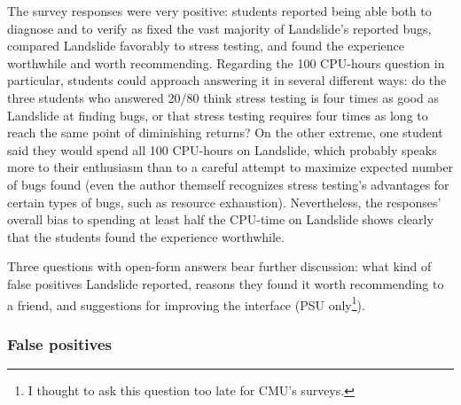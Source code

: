 The survey responses were very positive:
students reported being able both to diagnose and to verify as fixed the vast majority of Landslide's reported bugs,
compared Landslide favorably to stress testing,
and found the experience worthwhile and worth recommending.
Regarding the 100 CPU-hours question in particular,
students could approach answering it in several different ways:
do the three students who answered 20/80 think stress testing is four times as good as Landslide at finding bugs,
or that stress testing requires four times as long to reach the same point of diminishing returns?
On the other extreme, one student said they would spend all 100 CPU-hours on Landslide,
which probably speaks more to their enthusiasm than to a careful attempt to maximize expected number of bugs found
(even the author themself recognizes stress testing's advantages for certain types of bugs, such as resource exhaustion).
Nevertheless, the responses' overall bias to spending at least half the CPU-time on Landslide
shows clearly that the students found the experience worthwhile.

Three questions with open-form answers bear further discussion:
what kind of false positives Landslide reported, %
reasons they found it worth recommending to a friend,
and suggestions for improving the interface
(PSU only\footnote{I thought to ask this question too late for CMU's surveys.}). %

\subsubsection{False positives}
\label{sec:education-eval-survey-falsepositives}

